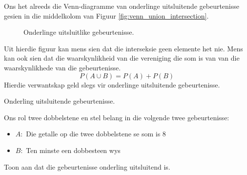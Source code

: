 Ons het alreeds die Venn-diagramme van onderlinge uitsluitende gebeurtenisse gesien in die middelkolom van Figuur \ref{fig:venn_union_intersection}.

\begin{figure}[h]
  
  \caption{Onderlinge uitsluitlike gebeurtenisse.}
\end{figure}

Uit hierdie figuur kan mens sien dat die interseksie geen elemente het nie. Mens kan ook sien dat die waarskynlikheid van die vereniging die som is van van die waarskynlikhede van die gebeurtenisse.
\[P(A \cup B) = P(A) + P(B)\]
Hierdie verwantskap geld slegs vir onderlinge uitsluitende gebeurtenisse.

\begin{wex}{Onderling uitsluitende gebeurtenisse.}{
  Ons rol twee dobbelstene en stel belang in die volgende twee gebeurtenisse:
  \begin{itemize}
  \item[] $A:$ Die getalle op die twee dobbelstene se som is $8$
  \item[] $B:$ Ten minste een dobbesteen wys 
  \end{itemize}
  Toon aan dat die gebeurtenisse onderling uitsluitend is.
}{

}
\end{wex}
